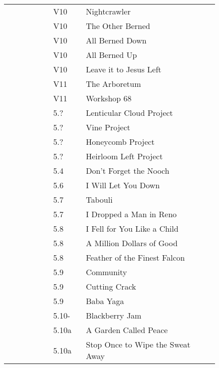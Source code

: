 \begin{flushleft}
\begin{center}
\begin{supertabular}{p{0.18\linewidth}p{0.13\linewidth}p{0.45\linewidth}p{0.08\linewidth}}
 &V10&Nightcrawler & \pageref{rt:Nightcrawler} \\
 &V10&The Other Berned & \pageref{rt:The Other Berned} \\
 &V10&All Berned Down & \pageref{rt:All Berned Down} \\
 &V10&All Berned Up & \pageref{rt:All Berned Up} \\
 &V10&Leave it to Jesus Left & \pageref{vr:Leave it to Jesus Left} \\
 &V11&The Arboretum & \pageref{rt:The Arboretum} \\
 &V11&Workshop 68 & \pageref{vr:Workshop 68} \\
&5.?&Lenticular Cloud Project & \pageref{rt:Lenticular Cloud Project} \\
&5.?&Vine Project & \pageref{rt:Vine Project} \\
&5.?&Honeycomb Project & \pageref{rt:Honeycomb Project} \\
&5.?&Heirloom Left Project & \pageref{vr:Heirloom Left Project} \\
&5.4&Don't Forget the Nooch & \pageref{rt:Don't Forget the Nooch} \\
&5.6&I Will Let You Down & \pageref{rt:I Will Let You Down} \\
&5.7&Tabouli & \pageref{rt:Tabouli} \\
&5.7&I Dropped a Man in Reno & \pageref{rt:I Dropped a Man in Reno} \\
&5.8&I Fell for You Like a Child & \pageref{rt:I Fell for You Like a Child} \\
&5.8&A Million Dollars of Good & \pageref{rt:A Million Dollars of Good} \\
&5.8&Feather of the Finest Falcon & \pageref{rt:Feather of the Finest Falcon} \\
&5.9&Community & \pageref{rt:Community} \\
&5.9&Cutting Crack & \pageref{rt:Cutting Crack} \\
&5.9&Baba Yaga & \pageref{rt:Baba Yaga} \\
&5.10-&Blackberry Jam & \pageref{rt:Blackberry Jam} \\
&5.10a&A Garden Called Peace & \pageref{rt:A Garden Called Peace} \\
&5.10a&Stop Once to Wipe the Sweat Away & \pageref{rt:Stop Once to Wipe the Sweat Away} \\

\end{supertabular}
\end{center}
\end{flushleft}

